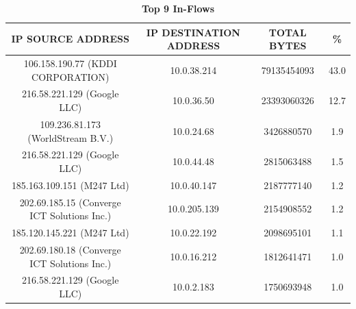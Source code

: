 \documentclass[journal]{IEEE/IEEEtran}
\begin{document}
\begin{table}[ht]
\centering
\caption{\textbf{Top 9 In-Flows}}
\label{top-in-flows}
\begin{tabular}{|c|c|c|c|}
\hline
\textbf{IP SOURCE ADDRESS} 						& \textbf{IP DESTINATION ADDRESS}	& \textbf{TOTAL BYTES} 	& \textbf{\%} \\ \hline
    106.158.190.77 (KDDI CORPORATION)			& 10.0.38.214						&  79135454093			& 43.0        \\ \hline
    216.58.221.129 (Google LLC)					& 10.0.36.50						&  23393060326          & 12.7        \\ \hline
    109.236.81.173 (WorldStream B.V.)			& 10.0.24.68						&  3426880570           & 1.9         \\ \hline
    216.58.221.129 (Google LLC)					& 10.0.44.48						&  2815063488           & 1.5         \\ \hline
    185.163.109.151 (M247 Ltd)					& 10.0.40.147						&  2187777140           & 1.2         \\ \hline
    202.69.185.15 (Converge ICT Solutions Inc.)	& 10.0.205.139						&  2154908552			& 1.2         \\ \hline
    185.120.145.221 (M247 Ltd)					& 10.0.22.192						&  2098695101           & 1.1         \\ \hline
    202.69.180.18 (Converge ICT Solutions Inc.)	& 10.0.16.212						&  1812641471           & 1.0         \\ \hline
    216.58.221.129 (Google LLC)					& 10.0.2.183						&  1750693948           & 1.0         \\ \hline
\end{tabular}
\end{table}
\end{document}
